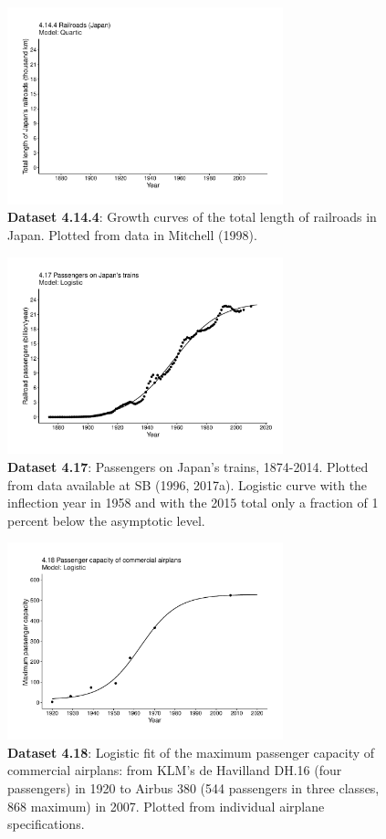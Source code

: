 \documentclass[aps,rmp,preprint,superscriptaddress,10pt,onecolumn]{article}
\begin{document}
\begin{figure}[h]
\includegraphics[width=8cm]{output/figs-ggplot/4.14.4.pdf}
\caption{\textbf{Dataset 4.14.4}: Growth curves of the total length of railroads in Japan. Plotted from data in Mitchell (1998).}
\end{figure}
	
\begin{figure}[h]
\includegraphics[width=8cm]{output/figs-ggplot/4.17.pdf}
\caption{\textbf{Dataset 4.17}: Passengers on Japan's trains, 1874-2014. Plotted from data available at SB (1996, 2017a). Logistic curve with the inflection year in 1958 and with the 2015 total only a fraction of 1 percent below the asymptotic level.}
\end{figure}
	
\begin{figure}[h]
\includegraphics[width=8cm]{output/figs-ggplot/4.18.pdf}
\caption{\textbf{Dataset 4.18}: Logistic fit of the maximum passenger capacity of commercial airplans: from KLM's de Havilland DH.16 (four passengers) in 1920 to Airbus 380 (544 passengers in three classes, 868 maximum) in 2007. Plotted from individual airplane specifications.}
\end{figure}
	
\end{document}
